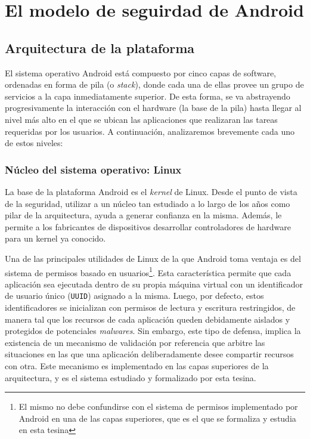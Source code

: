 \chapter{El modelo de seguirdad de Android}
\label{chapter:background}

\section{Arquitectura de la plataforma}
\label{section:architecture}

El sistema operativo Android está compuesto por cinco capas de software, ordenadas en forma de pila (o
\textit{stack}), donde cada una de ellas provee un grupo de servicios a la capa inmediatamente
superior. De esta forma, se va abstrayendo progresivamente la interacción con el hardware (la base de
la pila) hasta llegar al nivel más alto en el que se ubican las aplicaciones que realizaran las tareas
requeridas por los usuarios. A continuación, analizaremos brevemente cada uno de estos niveles:

\subsection{Núcleo del sistema operativo: Linux}
La base de la plataforma Android es el \textit{kernel} de Linux. Desde el punto de vista de la
seguridad, utilizar a un núcleo tan estudiado a lo largo de los años como pilar de la arquitectura,
ayuda a generar confianza en la misma. Además, le permite a los fabricantes de dispositivos
desarrollar controladores de hardware para un kernel ya conocido.

Una de las principales utilidades de Linux de la que Android toma ventaja es del sistema de permisos
basado en usuarios\footnote{El mismo no debe confundirse con el sistema de permisos implementado por
Android en una de las capas superiores, que es el que se formaliza y estudia en esta tesina}. Esta
característica permite que cada aplicación sea ejecutada dentro de su propia máquina virtual con un
identificador de usuario único (\texttt{UUID}) asignado a la misma. Luego, por defecto, estos
identificadores se inicializan con permisos de lectura y escritura restringidos, de manera tal que los
recursos de cada aplicación queden debidamente aislados y protegidos de potenciales \textit{malwares}.
Sin embargo, este tipo de defensa, implica la existencia de un mecanismo de validación por referencia
que arbitre las situaciones en las que una aplicación deliberadamente desee compartir recursos con
otra. Este mecanismo es implementado en las capas superiores de la arquitectura, y es el sistema
estudiado y formalizado por esta tesina.

